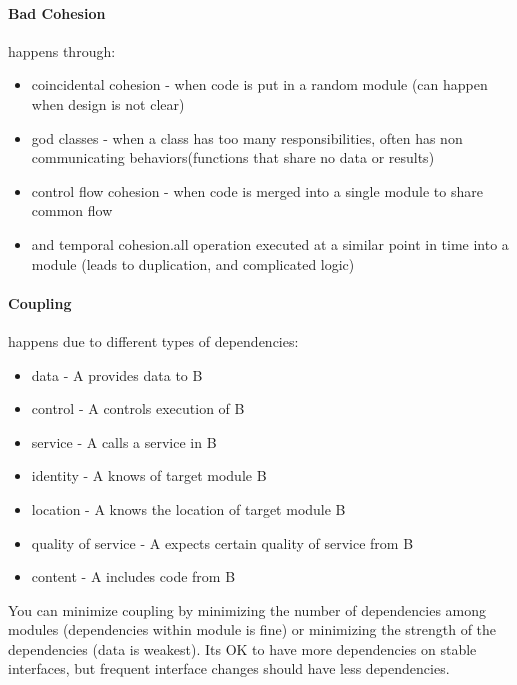 \documentclass{article}
\begin{document}
\paragraph{Bad Cohesion} %
\label{par:bad_cohesion}
happens through:
\begin{itemize}
    \item  coincidental cohesion - when code is put in a random module (can happen when design is not clear)
    \item  god classes - when a class has too many responsibilities, often has non communicating behaviors(functions that share no data or results)
    \item  control flow cohesion - when code is merged into a single module to share common flow
    \item  and temporal cohesion.all operation executed at a similar point in time into a module (leads to duplication, and complicated logic)
\end{itemize}


\paragraph{Coupling} %
\label{par:coupling}
happens due to different types of dependencies:
\begin{itemize}
    \item data - A provides data to B
    \item control - A controls execution of B
    \item service - A calls a service in B
    \item identity - A knows of target module B
    \item location - A knows the location of target module B
    \item quality of service - A expects certain quality of service from B
    \item content - A includes code from B
\end{itemize}
You can minimize coupling by minimizing the number of dependencies among modules (dependencies within module is fine) or minimizing the strength of the dependencies (data is weakest). Its OK to have more dependencies on stable interfaces, but frequent interface changes should have less dependencies.
\end{document}
